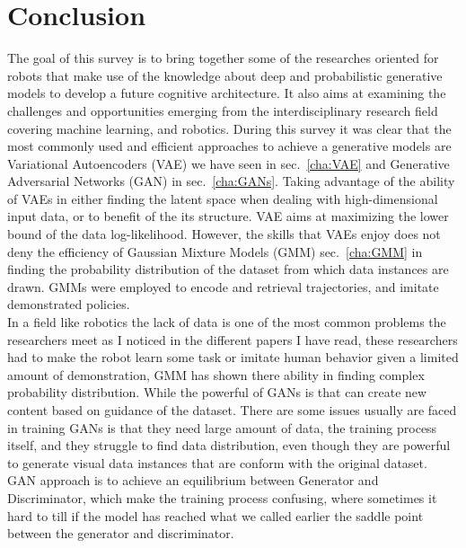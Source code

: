 
\pagestyle{fancy} 
\chapter*{Conclusion}
\vspace{-15pt}

The goal of this survey is to bring together some of the researches oriented for robots that make use of the knowledge about deep and probabilistic generative models to develop a future cognitive architecture. It also aims at examining the challenges and opportunities emerging from the interdisciplinary research field covering machine learning, and robotics. During this survey it was clear that the most commonly used and efficient approaches to achieve a generative models are Variational Autoencoders (VAE) we have seen in sec.~\ref{cha:VAE} and Generative Adversarial Networks (GAN) in sec.~\ref{cha:GANs}. Taking advantage of the ability of VAEs in either finding the latent space when dealing with high-dimensional input data, or to benefit of the its structure. VAE aims at maximizing the lower bound of the data log-likelihood. However, the skills that VAEs enjoy does not deny the efficiency of Gaussian Mixture Models (GMM) sec.~\ref{cha:GMM} in finding the probability distribution of the dataset from which data instances are drawn. GMMs were employed to encode and retrieval trajectories, and imitate demonstrated policies.\\ In a field like robotics the lack of data is one of the most common problems the researchers meet as I noticed in the different papers I have read, these researchers had to make the robot learn some task or imitate human behavior given a limited amount of demonstration, GMM has shown there ability in finding complex probability distribution. While the powerful of GANs is that can create new content based on guidance of the dataset. There are some issues usually are faced in training GANs is that they need large amount of data, the training process itself, and they struggle to find data distribution, even though they are powerful to generate visual data instances that are conform with the original dataset. GAN approach is to achieve an equilibrium between Generator and Discriminator, which make the training process confusing, where sometimes it hard to till if the model has reached what we called earlier the saddle point between the generator and discriminator. \\
